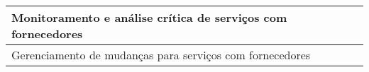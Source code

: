 \begin{table}[]
\begin{center}
\begin{tabular}{|l|}
Monitoramento e análise crítica de serviços com fornecedores                                                                                                                                                                              \\ \hline
Gerenciamento de mudanças para serviços com fornecedores                                                                                                                                                                                  \\ \hline
\end{tabular}
\end{center}
\end{table}



